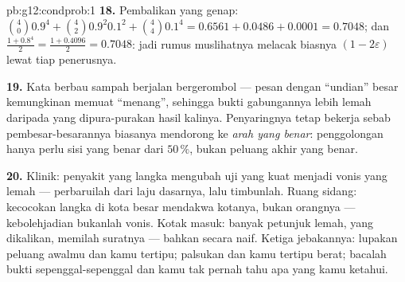 \begin{solution}{pb:g12:condprob:1}
\textbf{18.} Pembalikan yang genap: $\binom40 0.9^4 + \binom42 0.9^2
0.1^2 + \binom44 0.1^4 = 0.6561 + 0.0486 + 0.0001 = 0.7048$;
dan $\frac{1 + 0.8^4}{2} = \frac{1 + 0.4096}{2} = 0.7048$:
jadi rumus muslihatnya melacak biasnya $(1 - 2\varepsilon)$
lewat tiap penerusnya.

\textbf{19.} Kata berbau sampah berjalan bergerombol --- pesan dengan
``undian'' besar kemungkinan memuat ``menang'', sehingga bukti gabungannya
lebih lemah daripada yang dipura-purakan hasil kalinya. Penyaringnya
tetap bekerja sebab pembesar-besarannya biasanya mendorong ke
\emph{arah yang benar}: penggolongan hanya perlu sisi yang benar
dari $50\,\%$, bukan peluang akhir yang benar.

\textbf{20.} Klinik: penyakit yang langka mengubah uji yang kuat
menjadi vonis yang lemah --- perbaruilah dari laju dasarnya, lalu
timbunlah. Ruang sidang: kecocokan langka di kota besar mendakwa
kotanya, bukan orangnya --- kebolehjadian bukanlah vonis.
Kotak masuk: banyak petunjuk lemah, yang dikalikan, memilah suratnya --- bahkan
secara naif. Ketiga jebakannya: lupakan peluang awalmu dan kamu tertipu;
palsukan  dan kamu tertipu berat; bacalah bukti sepenggal-sepenggal
dan kamu tak pernah tahu apa yang kamu ketahui.

\end{solution}
